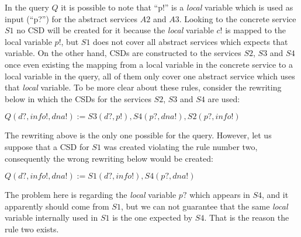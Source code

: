 In the query $Q$ it is possible to note that ``p!'' is a \textit{local} variable which is used as input (``p?'') for the abstract services $A2$ and $A3$. 
Looking to the concrete service $S1$ no CSD will be created for it because the \textit{local} variable $c!$ is mapped to the local variable $p!$, but $S1$ does not cover all abstract services which expects that variable. 
On the other hand, CSDs are constructed to the services $S2$, $S3$ and $S4$ once even existing the mapping from a local variable in the concrete service to a local variable in the query, all of them only cover one abstract service which uses that \textit{local} variable.
To be more clear about these rules, consider the rewriting below in which the CSDs for the services  $S2$, $S3$ and $S4$ are used:

\begin{center}
$Q (d?, info!, dna!) := S3(d?, p!), S4(p?, dna!), S2(p?, info!)$ \\
\end{center}  

The rewriting above is the only one possible for the query. 
However, let us suppose that a CSD for $S1$ was created violating the rule number two, consequently the wrong rewriting below would be created:

\begin{center}
$Q (d?, info!, dna!) := S1(d?, info!),S4(p?, dna!)$ \\
\end{center}  

The problem here is regarding the \textit{local} variable $p?$ which appears in $S4$, and it apparently should come from $S1$, but we can not guarantee that the same \textit{local} variable internally used in $S1$ is the one expected by $S4$. 
That is the reason the rule two exists.

%
%


